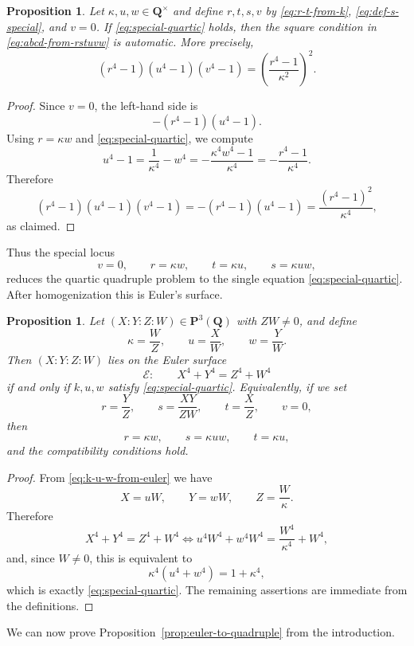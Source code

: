 \documentclass[11pt]{article}
\newtheorem{proposition}[theorem]{Proposition}
\newcommand{\Q}{\mathbf{Q}}
\newcommand{\Pj}{\mathbf{P}}
\newcommand{\Eul}{\mathcal{E}}
\begin{document}
\begin{proposition}\label{prop:auto-square-special}
Let $\kappa,u,w\in\Q^\times$ and define $r,t,s,v$ by \eqref{eq:r-t-from-k}, \eqref{eq:def-s-special}, and $v=0$. If \eqref{eq:special-quartic} holds, then the square condition in \eqref{eq:abcd-from-rstuvw} is automatic. More precisely,
\[
(r^4-1)(u^4-1)(v^4-1)=\left(\frac{r^4-1}{\kappa^2}\right)^2.
\]
\end{proposition}

\begin{proof}
Since $v=0$, the left-hand side is
\[
-(r^4-1)(u^4-1).
\]
Using $r=\kappa w$ and \eqref{eq:special-quartic}, we compute
\[
u^4-1=\frac{1}{\kappa^4}-w^4=-\frac{\kappa^4w^4-1}{\kappa^4}=-\frac{r^4-1}{\kappa^4}.
\]
Therefore
\[
(r^4-1)(u^4-1)(v^4-1)=-(r^4-1)(u^4-1)=\frac{(r^4-1)^2}{\kappa^4},
\]
as claimed.
\end{proof}

Thus the special locus
\[
v=0,\qquad r=\kappa w,\qquad t=\kappa u,\qquad s=\kappa uw,
\]
reduces the quartic quadruple problem to the single equation \eqref{eq:special-quartic}. After homogenization this is Euler's surface.

\begin{proposition}\label{prop:euler-specialization}
Let $(X:Y:Z:W)\in\Pj^3(\Q)$ with $ZW\neq 0$, and define
\begin{equation}\label{eq:k-u-w-from-euler}
\kappa=\frac{W}{Z},\qquad u=\frac{X}{W},\qquad w=\frac{Y}{W}.
\end{equation}
Then $(X:Y:Z:W)$ lies on the Euler surface
\[
\Eul:\qquad X^4+Y^4=Z^4+W^4
\]
if and only if $k,u,w$ satisfy \eqref{eq:special-quartic}. Equivalently, if we set
\[
r=\frac{Y}{Z},\qquad s=\frac{XY}{ZW},\qquad t=\frac{X}{Z},\qquad v=0,
\]
then
\[
r=\kappa w,\qquad s=\kappa uw,\qquad t=\kappa u,
\]
and the compatibility conditions hold.
\end{proposition}

\begin{proof}
From \eqref{eq:k-u-w-from-euler} we have
\[
X=uW,\qquad Y=wW,\qquad Z=\frac{W}{\kappa}.
\]
Therefore
\[
X^4+Y^4=Z^4+W^4
\iff
u^4W^4+w^4W^4=\frac{W^4}{\kappa^4}+W^4,
\]
and, since $W\neq 0$, this is equivalent to
\[
\kappa^4(u^4+w^4)=1+\kappa^4,
\]
which is exactly \eqref{eq:special-quartic}. The remaining assertions are immediate from the definitions.
\end{proof}

We can now prove Proposition~\ref{prop:euler-to-quadruple} from the introduction.
\end{document}
